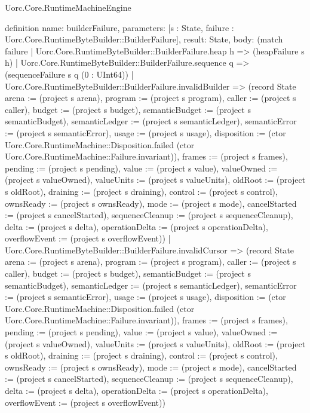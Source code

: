 \begin{lexlean}{Uorc.Core.RuntimeMachineEngine}
\begin{semanticmodule}
definition{
  name: builderFailure,
  parameters: [s : State, failure : Uorc.Core.RuntimeByteBuilder::BuilderFailure],
  result: State,
  body: (match failure
    | Uorc.Core.RuntimeByteBuilder::BuilderFailure.heap h => (heapFailure s h)
    | Uorc.Core.RuntimeByteBuilder::BuilderFailure.sequence q => (sequenceFailure s q (0 : UInt64))
    | Uorc.Core.RuntimeByteBuilder::BuilderFailure.invalidBuilder => (record State {arena := (project s arena), program := (project s program), caller := (project s caller), budget := (project s budget), semanticBudget := (project s semanticBudget), semanticLedger := (project s semanticLedger), semanticError := (project s semanticError), usage := (project s usage), disposition := (ctor Uorc.Core.RuntimeMachine::Disposition.failed (ctor Uorc.Core.RuntimeMachine::Failure.invariant)), frames := (project s frames), pending := (project s pending), value := (project s value), valueOwned := (project s valueOwned), valueUnits := (project s valueUnits), oldRoot := (project s oldRoot), draining := (project s draining), control := (project s control), ownsReady := (project s ownsReady), mode := (project s mode), cancelStarted := (project s cancelStarted), sequenceCleanup := (project s sequenceCleanup), delta := (project s delta), operationDelta := (project s operationDelta), overflowEvent := (project s overflowEvent)})
    | Uorc.Core.RuntimeByteBuilder::BuilderFailure.invalidCursor => (record State {arena := (project s arena), program := (project s program), caller := (project s caller), budget := (project s budget), semanticBudget := (project s semanticBudget), semanticLedger := (project s semanticLedger), semanticError := (project s semanticError), usage := (project s usage), disposition := (ctor Uorc.Core.RuntimeMachine::Disposition.failed (ctor Uorc.Core.RuntimeMachine::Failure.invariant)), frames := (project s frames), pending := (project s pending), value := (project s value), valueOwned := (project s valueOwned), valueUnits := (project s valueUnits), oldRoot := (project s oldRoot), draining := (project s draining), control := (project s control), ownsReady := (project s ownsReady), mode := (project s mode), cancelStarted := (project s cancelStarted), sequenceCleanup := (project s sequenceCleanup), delta := (project s delta), operationDelta := (project s operationDelta), overflowEvent := (project s overflowEvent)})
}
\end{semanticmodule}
\end{lexlean}
